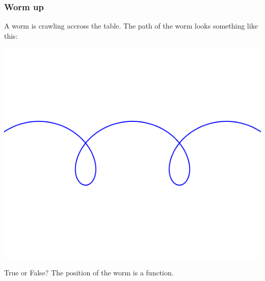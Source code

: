 \documentclass[14pt]{beamer}
\date{}
\title{}
\author{}
\begin{document}

\begin{frame}[t]
\frametitle{Worm up}



A worm is crawling accross the table.  The path of the worm looks something like this:


	\begin{center}
		\includegraphics[scale=.3]{G11}
	\end{center}

\vspace{-1cm}

\begin{block}{True or False?}
The position of the worm is a function.
\end{block}

\end{frame}
\end{document}

